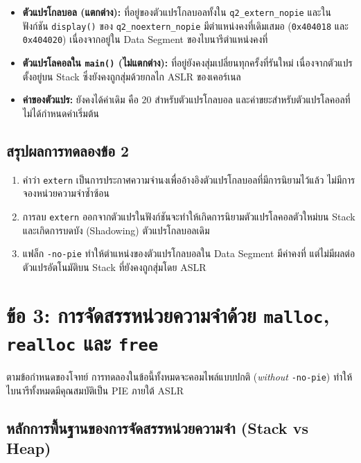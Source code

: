 \documentclass[a4paper,11pt]{article}
\newcommand{\code}[1]{\texttt{#1}}
\begin{document}
\begin{itemize}[leftmargin=*]
  \item \textbf{ตัวแปรโกลบอล (แตกต่าง):} ที่อยู่ของตัวแปรโกลบอลทั้งใน \code{q2\_extern\_nopie} และในฟังก์ชัน \code{display()} ของ \code{q2\_noextern\_nopie} มีตำแหน่งคงที่เดิมเสมอ (\code{0x404018} และ \code{0x404020}) เนื่องจากอยู่ใน Data Segment ของไบนารีตำแหน่งคงที่
  \item \textbf{ตัวแปรโลคอลใน \code{main()} (ไม่แตกต่าง):} ที่อยู่ยังคงสุ่มเปลี่ยนทุกครั้งที่รันใหม่ เนื่องจากตัวแปรตั้งอยู่บน Stack ซึ่งยังคงถูกสุ่มด้วยกลไก ASLR ของเคอร์เนล
  \item \textbf{ค่าของตัวแปร:} ยังคงได้ค่าเดิม คือ $20$ สำหรับตัวแปรโกลบอล และค่าขยะสำหรับตัวแปรโลคอลที่ไม่ได้กำหนดค่าเริ่มต้น
\end{itemize}

\subsection{สรุปผลการทดลองข้อ 2}

\begin{enumerate}[leftmargin=*]
  \item คำว่า \code{extern} เป็นการประกาศความจำนงเพื่ออ้างอิงตัวแปรโกลบอลที่มีการนิยามไว้แล้ว ไม่มีการจองหน่วยความจำซ้ำซ้อน
  \item การลบ \code{extern} ออกจากตัวแปรในฟังก์ชันจะทำให้เกิดการนิยามตัวแปรโลคอลตัวใหม่บน Stack และเกิดการบดบัง (Shadowing) ตัวแปรโกลบอลเดิม
  \item แฟล็ก \code{-no-pie} ทำให้ตำแหน่งของตัวแปรโกลบอลใน Data Segment มีค่าคงที่ แต่ไม่มีผลต่อตัวแปรอัตโนมัติบน Stack ที่ยังคงถูกสุ่มโดย ASLR
\end{enumerate}

\section{ข้อ 3: การจัดสรรหน่วยความจำด้วย \code{malloc}, \code{realloc} และ \code{free}}

ตามข้อกำหนดของโจทย์ การทดลองในข้อนี้ทั้งหมดจะคอมไพล์แบบปกติ (\emph{without} \code{-no-pie}) ทำให้ไบนารีทั้งหมดมีคุณสมบัติเป็น PIE ภายใต้ ASLR

\subsection{หลักการพื้นฐานของการจัดสรรหน่วยความจำ (Stack vs Heap)}
\end{document}
